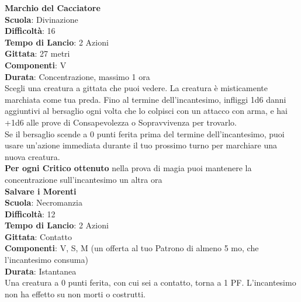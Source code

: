 \begin{multicols}{2}
\medskip\textbf{Marchio del Cacciatore}\\
\textbf{Scuola}: Divinazione\\
\textbf{Difficoltà}: 16\\
\textbf{Tempo di Lancio}: 2 Azioni\\
\textbf{Gittata}: 27 metri\\
\textbf{Componenti}: V \\
\textbf{Durata}: Concentrazione, massimo 1 ora\\
Scegli una creatura a gittata che puoi vedere. La creatura è misticamente marchiata come tua preda. Fino al termine dell’incantesimo, infliggi 1d6 danni aggiuntivi al bersaglio ogni volta che lo colpisci con un attacco con arma, e hai +1d6  alle prove di Consapevolezza o Sopravvivenza per trovarlo.\\
Se il bersaglio scende a 0 punti ferita prima del termine dell’incantesimo, puoi usare un’azione immediata durante il tuo prossimo turno per marchiare una nuova creatura.\\
\textbf{Per ogni Critico ottenuto} nella prova di magia puoi mantenere la concentrazione sull’incantesimo un altra ora\\

\medskip\textbf{Salvare i Morenti}\\
\textbf{Scuola}: Necromanzia\\
\textbf{Difficoltà}: 12\\
\textbf{Tempo di Lancio}: 2 Azioni\\
\textbf{Gittata}: Contatto\\
\textbf{Componenti}: V, S, M (un offerta al tuo Patrono di almeno 5 mo, che l'incantesimo consuma)\\	
\textbf{Durata}: Istantanea\\
Una creatura a 0 punti ferita, con cui sei a contatto, torna a 1 PF. L'incantesimo non ha effetto su non morti o costrutti.


\end{multicols}
